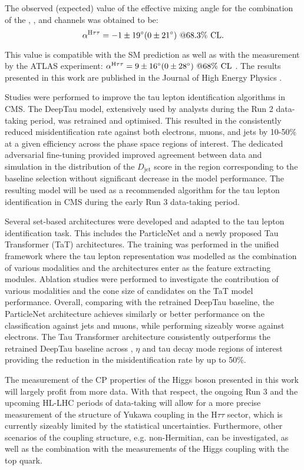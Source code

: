 The observed (expected) value of the effective mixing angle for the combination of the \et, \mt, and \tata channels was obtained to be:
\begin{equation}
    \alpha^{\text{H}\tau\tau} = -1 \pm 19^\circ (0 \pm 21^\circ) ~@68.3\% \text{ CL}.
\end{equation}

This value is compatible with the SM prediction as well as with the measurement by the ATLAS experiment: $\alpha^{\text{H}\tau\tau} = 9 \pm 16^\circ (0 \pm 28^\circ) ~@68\% \text{ CL}$ \cite{ATLAS:2022phj}. The results presented in this work are published in the Journal of High Energy Physics \cite{CMS:2021sdq}.

Studies were performed to improve the tau lepton identification algorithms in CMS. The DeepTau model, extensively used by analysts during the Run 2 data-taking period, was retrained and optimised. This resulted in the consistently reduced misidentification rate against both electrons, muons, and jets by 10-50\% at a given efficiency across the phase space regions of interest. The dedicated adversarial fine-tuning provided improved agreement between data and simulation in the distribution of the $D_\text{jet}$ score in the region corresponding to the baseline \htt selection without significant decrease in the model performance. The resulting model will be used as a recommended algorithm for the tau lepton identification in CMS during the early Run 3 data-taking period. 

Several set-based architectures were developed and adapted to the tau lepton identification task. This includes the ParticleNet and a newly proposed Tau Transformer (TaT) architectures. The training was performed in the unified framework where the tau lepton representation was modelled as the combination of various modalities and the architectures enter as the feature extracting modules. Ablation studies were performed to investigate the contribution of various modalities and the cone size of \tauh candidates on the TaT model performance. Overall, comparing with the retrained DeepTau baseline, the ParticleNet architecture achieves similarly or better performance on the \tauh classification against jets and muons, while performing sizeably worse against electrons. The Tau Transformer architecture consistently outperforms the retrained DeepTau baseline across \pt, $\eta$ and tau decay mode regions of interest providing the reduction in the misidentification rate by up to 50\%. 

The measurement of the CP properties of the Higgs boson presented in this work will largely profit from more data. With that respect, the ongoing Run 3 and the upcoming HL-LHC periods of data-taking will allow for a more precise measurement of the structure of Yukawa coupling in the $\text{H}\tau\tau$ sector, which is currently sizeably limited by the statistical uncertainties. Furthermore, other scenarios of the coupling structure, e.g. non-Hermitian, can be investigated, as well as the combination with the measurements of the Higgs coupling with the top quark.  

